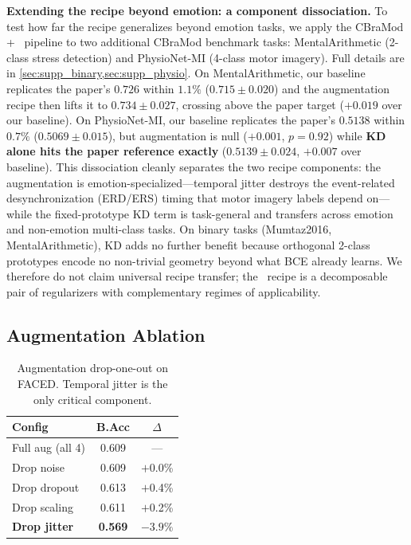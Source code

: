 \noindent\textbf{Extending the recipe beyond emotion: a component dissociation.} To test how far the recipe generalizes beyond emotion tasks, we apply the CBraMod + \ours\ pipeline to two additional CBraMod benchmark tasks: MentalArithmetic (2-class stress detection) and PhysioNet-MI (4-class motor imagery). Full details are in \cref{sec:supp_binary,sec:supp_physio}. On MentalArithmetic, our baseline replicates the paper's $0.726$ within $1.1\%$ ($0.715 \pm 0.020$) and the augmentation recipe then lifts it to $\mathbf{0.734 \pm 0.027}$, crossing above the paper target ($+0.019$ over our baseline). On PhysioNet-MI, our baseline replicates the paper's $0.5138$ within $0.7\%$ ($0.5069 \pm 0.015$), but augmentation is null ($+0.001$, $p=0.92$) while \textbf{KD alone hits the paper reference exactly} ($0.5139 \pm 0.024$, $+0.007$ over baseline). This dissociation cleanly separates the two recipe components: the augmentation is emotion-specialized---temporal jitter destroys the event-related desynchronization (ERD/ERS) timing that motor imagery labels depend on---while the fixed-prototype KD term is task-general and transfers across emotion and non-emotion multi-class tasks. On binary tasks (Mumtaz2016, MentalArithmetic), KD adds no further benefit because orthogonal 2-class prototypes encode no non-trivial geometry beyond what BCE already learns. We therefore do not claim universal recipe transfer; the \ours\ recipe is a decomposable pair of regularizers with complementary regimes of applicability.

\subsection{Augmentation Ablation}
\label{sec:aug_ablation}
\vspace{-1mm}

\begin{table}%
  \centering
  \vspace{-5mm}
  \caption{Augmentation drop-one-out on FACED. Temporal jitter is the only critical component.}
  \small
  \begin{tabular}{lcc}
  \toprule
  Config & B.Acc & $\Delta$ \\
  \midrule
  Full aug (all 4) & 0.609 & --- \\
  Drop noise & 0.609 & $+$0.0\% \\
  Drop dropout & 0.613 & $+$0.4\% \\
  Drop scaling & 0.611 & $+$0.2\% \\
  \textbf{Drop jitter} & \textbf{0.569} & $\mathbf{-3.9\%}$ \\
  \bottomrule
  \end{tabular}
  \label{tab:aug_ablation}
\end{table}

